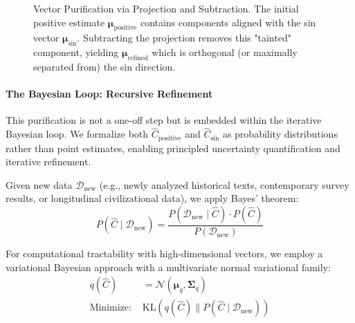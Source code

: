 \documentclass[11pt,a4paper]{article}
\theoremstyle{definition}
\theoremstyle{remark}
\begin{document}
\begin{figure}[h!]
    \caption{Vector Purification via Projection and Subtraction. The initial positive estimate \(\boldsymbol{\mu}_{\text{positive}}\) contains components aligned with the sin vector \(\boldsymbol{\mu}_{\text{sin}}\). Subtracting the projection removes this "tainted" component, yielding \(\boldsymbol{\mu}_{\text{refined}}\) which is orthogonal (or maximally separated from) the sin direction.}
    \label{fig:vector_purification}
\end{figure}

\paragraph{The Bayesian Loop: Recursive Refinement}

This purification is not a one-off step but is embedded within the iterative Bayesian loop. We formalize both \(\hat{C}_{\text{positive}}\) and \(\hat{C}_{\text{sin}}\) as probability distributions rather than point estimates, enabling principled uncertainty quantification and iterative refinement. 

Given new data \(\mathcal{D}_{\text{new}}\) (e.g., newly analyzed historical texts, contemporary survey results, or longitudinal civilizational data), we apply Bayes' theorem:
\begin{equation}
P(\hat{C} \mid \mathcal{D}_{\text{new}}) = \frac{P(\mathcal{D}_{\text{new}} \mid \hat{C}) \cdot P(\hat{C})}{P(\mathcal{D}_{\text{new}})}
\end{equation}

For computational tractability with high-dimensional vectors, we employ a variational Bayesian approach with a multivariate normal variational family:
\begin{align}
q(\hat{C}) &= \mathcal{N}(\boldsymbol{\mu}_q, \boldsymbol{\Sigma}_q) \\
\text{Minimize: } &\text{KL}(q(\hat{C}) \parallel P(\hat{C} \mid \mathcal{D}_{\text{new}}))
\end{align}
\end{document}
